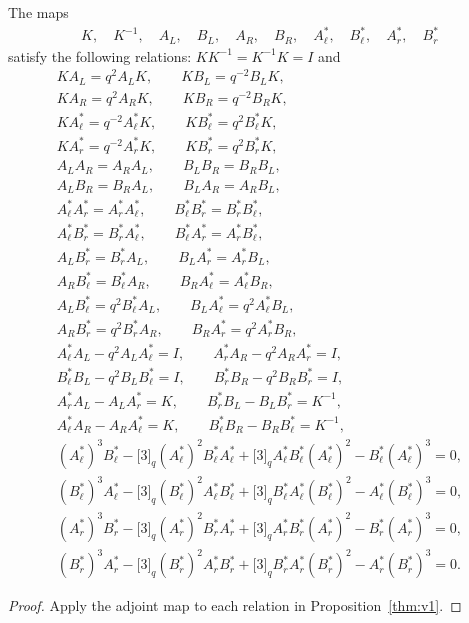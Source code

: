 \begin{Proposition}\label{thm:v2}The maps
\begin{gather}\label{eq:maplist2}
K, \quad K^{-1},
\quad
A_L,
\quad
B_L,
\quad
A_R,
\quad
B_R,
\quad
A^*_\ell,
\quad
B^*_\ell,
\quad
A^*_r,
\quad
B^*_r
\end{gather}
satisfy the following relations: $K K^{-1} = K^{-1}K = I$ and
\begin{gather*}
K A_L = q^{2} A_L K,\qquad K B_L = q^{-2} B_L K,\\
K A_R = q^{2} A_R K,\qquad K B_R = q^{-2} B_R K,\\
K A^*_\ell = q^{-2} A^*_\ell K,\qquad K B^*_\ell = q^{2} B^*_\ell K,\\
K A^*_r = q^{-2} A^*_r K,\qquad K B^*_r = q^{2} B^*_r K,\\
A_L A_R = A_R A_L, \qquad B_L B_R = B_R B_L,\\
A_L B_R = B_R A_L, \qquad B_L A_R = A_R B_L,\\
A^*_\ell A^*_r = A^*_r A^*_\ell, \qquad B^*_\ell B^*_r = B^*_r B^*_\ell,\\
A^*_\ell B^*_r = B^*_r A^*_\ell, \qquad B^*_\ell A^*_r = A^*_r B^*_\ell,\\
A_L B^*_r = B^*_r A_L, \qquad B_L A^*_r = A^*_r B_L,\\
 A_R B^*_\ell = B^*_\ell A_R, \qquad B_R A^*_\ell = A^*_\ell B_R,\\
A_L B^*_\ell = q^{2} B^*_\ell A_L, \qquad B_L A^*_\ell = q^{2} A^*_\ell B_L,\\
A_R B^*_r = q^{2} B^*_r A_R, \qquad B_R A^*_r = q^{2} A^*_r B_R,\\
 A^*_\ell A_L - q^{2} A_L A^*_\ell = I,\qquad A^*_r A_R - q^2 A_R A^*_r = I,\\
 B^*_\ell B_L - q^2 B_L B^*_\ell = I,\qquad B^*_r B_R - q^2 B_R B^*_r = I,\\
A^*_r A_L - A_L A^*_r = K,\qquad B^*_r B_L - B_L B^*_r = K^{-1},\\
A^*_\ell A_R - A_R A^*_\ell = K,\qquad B^*_\ell B_R - B_R B^*_\ell = K^{-1},\\
(A^*_\ell)^3 B^*_\ell-\lbrack 3 \rbrack_q (A^*_\ell)^2 B^*_\ell A^*_\ell+
\lbrack 3 \rbrack_q A^*_\ell B^*_\ell (A^*_\ell)^2-B^*_\ell (A^*_\ell)^3 = 0,\\
(B^*_\ell)^3 A^*_\ell-\lbrack 3 \rbrack_q (B^*_\ell)^2 A^*_\ell B^*_\ell+
\lbrack 3 \rbrack_q B^*_\ell A^*_\ell (B^*_\ell)^2-A^*_\ell (B^*_\ell)^3 = 0,\\
(A^*_r)^3 B^*_r-\lbrack 3 \rbrack_q (A^*_r)^2 B^*_r A^*_r+\lbrack 3 \rbrack_q A^*_r B^*_r (A^*_r)^2-
B^*_r (A^*_r)^3 = 0,\\
(B^*_r)^3 A^*_r-\lbrack 3 \rbrack_q (B^*_r)^2 A^*_r B^*_r+
\lbrack 3 \rbrack_q B^*_r A^*_r (B^*_r)^2-A^*_r (B^*_r)^3 = 0.
\end{gather*}
\end{Proposition}
\begin{proof} Apply the adjoint map to each relation in Proposition~\ref{thm:v1}.
\end{proof}

